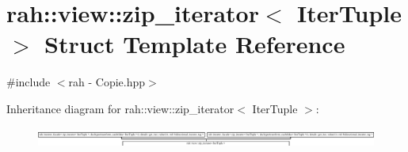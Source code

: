 \hypertarget{structrah_1_1view_1_1zip__iterator}{}\section{rah\+::view\+::zip\+\_\+iterator$<$ Iter\+Tuple $>$ Struct Template Reference}
\label{structrah_1_1view_1_1zip__iterator}


{\ttfamily \#include $<$rah -\/ Copie.\+hpp$>$}

Inheritance diagram for rah\+::view\+::zip\+\_\+iterator$<$ Iter\+Tuple $>$\+:\begin{figure}[H]
\begin{center}
\leavevmode
\includegraphics[height=0.645905cm]{structrah_1_1view_1_1zip__iterator}
\end{center}
\end{figure}
